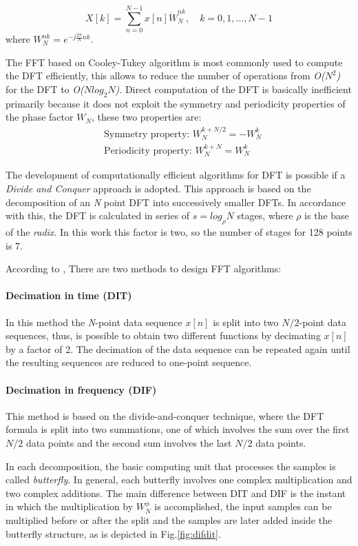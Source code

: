 \documentclass[journal,comsoc]{IEEEtran}
\begin{document}
\begin{equation}
	X[k] = \sum_{n=0}^{N-1} x[n] \dot W_N^{nk}, \quad k=0,1,...,N-1
\end{equation}
where $W_N^{nk} = e^{-j\frac{2\pi}{N} nk}$. 

The FFT based on Cooley-Tukey algorithm is most commonly used to compute the DFT efficiently, this allows to reduce the number of operations from \textit{O($N^2$)} for the DFT to \textit{O($Nlog_2N$)}. Direct computation of the DFT is basically inefficient primarily because it does not exploit the symmetry and periodicity properties of the phase factor $W_N$, these two properties are:
\begin{align}
	&\text{Symmetry property: } W_N^{k+N/2} = -W_N^k	\\
	&\text{Periodicity property: } W_N^{k+N} = W_N^k
\end{align}

The development of computationally efficient algorithms for DFT is possible if a \textit{Divide and Conquer} approach is adopted. This approach is based on the decomposition of an \textit{N} point DFT into successively smaller DFTs. In accordance with this, the DFT is calculated in series of $s=log_\rho N$ stages, where $\rho$ is the base of the \textit{radix}. In this work this factor is two, so the number of stages for 128 points is 7.

According to \cite{proakis_digital_nodate,oppenheim_tratamiento_2011}, There are two methods to design FFT algorithms: 
\paragraph{Decimation in time (DIT)}
In this method the \textit{N}-point data sequence $x[n]$ is split into two $N/2$-point data sequences, thus, is possible to obtain two different functions by decimating $x[n]$ by a factor of 2. The decimation of the data sequence can be repeated again until the resulting sequences are reduced to one-point sequence. 
\paragraph{Decimation in frequency (DIF)}
This method is based on the divide-and-conquer technique, where the DFT formula is split into two summations, one of which involves the sum over the first $N/2$ data points and the second sum involves the last $N/2$ data points.

In each decomposition, the basic computing unit that processes the samples is called \textit{butterfly}. In general, each butterfly involves one complex multiplication and two complex additions. The main difference between DIT and DIF is the instant in which the multiplication by $W_N^\phi$ is accomplished, the input samples can be multiplied before or after the split and the samples are later added inside the butterfly structure, as is depicted in Fig.\ref{fig:difdit}.
\end{document}
